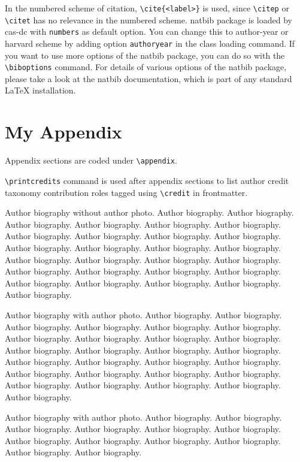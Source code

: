 \documentclass[a4paper,fleqn]{cas-dc}
\begin{document}
			In the numbered scheme of citation, \verb+\cite{<label>}+ is used,
			since \verb+\citep+ or \verb+\citet+ has no relevance in the numbered
			scheme.  {natbib} package is loaded by {cas-dc} with
			\verb+numbers+ as default option.  You can change this to author-year
			or harvard scheme by adding option \verb+authoryear+ in the class
			loading command.  If you want to use more options of the {natbib}
			package, you can do so with the \verb+\biboptions+ command.  For
			details of various options of the {natbib} package, please take a
			look at the {natbib} documentation, which is part of any standard
			\LaTeX{} installation.
			
			\appendix
			\section{My Appendix}
			Appendix sections are coded under \verb+\appendix+.
			
			\verb+\printcredits+ command is used after appendix sections to list 
			author credit taxonomy contribution roles tagged using \verb+\credit+ 
			in frontmatter.
			
			\printcredits
			
			
			
			
			
			
			
			\bio{}
			Author biography without author photo.
			Author biography. Author biography. Author biography.
			Author biography. Author biography. Author biography.
			Author biography. Author biography. Author biography.
			Author biography. Author biography. Author biography.
			Author biography. Author biography. Author biography.
			Author biography. Author biography. Author biography.
			Author biography. Author biography. Author biography.
			Author biography. Author biography. Author biography.
			Author biography. Author biography. Author biography.
			\endbio
			
			Author biography with author photo.
			Author biography. Author biography. Author biography.
			Author biography. Author biography. Author biography.
			Author biography. Author biography. Author biography.
			Author biography. Author biography. Author biography.
			Author biography. Author biography. Author biography.
			Author biography. Author biography. Author biography.
			Author biography. Author biography. Author biography.
			Author biography. Author biography. Author biography.
			Author biography. Author biography. Author biography.
			\endbio
			
			Author biography with author photo.
			Author biography. Author biography. Author biography.
			Author biography. Author biography. Author biography.
			Author biography. Author biography. Author biography.
			Author biography. Author biography. Author biography.
			\endbio
			
		
\end{document}
